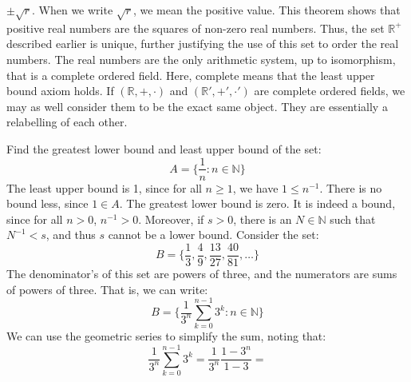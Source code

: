 \documentclass[crop=false,class=book,oneside]{standalone}
\begin{document}
            $\pm\sqrt{r}$. When we write $\sqrt{r}$, we mean the
            positive value. This theorem shows that positive real
            numbers are the squares of non-zero real numbers.
            Thus, the set $\mathbb{R}^{+}$ described earlier is
            unique, further justifying the use of this set to
            order the real numbers. The real numbers are the only
            arithmetic system, up to isomorphism, that is a
            complete ordered field. Here, complete means that the
            least upper bound axiom holds. If
            $(\mathbb{R},+,\cdot)$ and $(\mathbb{R}',+',\cdot')$
            are complete ordered fields, we may as well consider
            them to be the exact same object. They are essentially
            a relabelling of each other.
            \begin{lexample}
                Find the greatest lower bound and least upper bound
                of the set:
                \begin{equation}
                    A=\{\frac{1}{n}:n\in\mathbb{N}\}
                \end{equation}
                The least upper bound is 1, since for all
                $n\geq{1}$, we have $1\leq{n}^{\minus{1}}$. There
                is no bound less, since $1\in{A}$. The greatest
                lower bound is zero. It is indeed a bound, since
                for all $n>0$, $n^{\minus{1}}>0$. Moreover, if
                $s>0$, there is an $N\in\mathbb{N}$ such that
                $N^{\minus{1}}<s$, and thus $s$ cannot be a lower
                bound. Consider the set:
                \begin{equation}
                    B=\{\frac{1}{3},\frac{4}{9},
                        \frac{13}{27},\frac{40}{81},\dots\}
                \end{equation}
                The denominator's of this set are powers of
                three, and the numerators are sums of powers of
                three. That is, we can write:
                \begin{equation}
                    B=\Big\{\frac{1}{3^{n}}\sum_{k=0}^{n-1}3^{k}:
                        n\in\mathbb{N}\Big\}
                \end{equation}
                We can use the geometric series to simplify the
                sum, noting that:
                \begin{equation}
                    \frac{1}{3^{n}}\sum_{k=0}^{n-1}3^{k}=
                    \frac{1}{3^{n}}\frac{1-3^{n}}{1-3}=

\end{equation}
\end{lexample}
\end{document}
